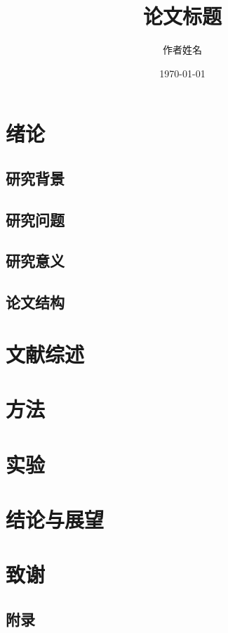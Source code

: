 \documentclass[UTF8,a4paper,12pt]{ctexbook}
\title{论文标题}
\author{作者姓名}
\date{\today}
\begin{document}
\maketitle
\frontmatter
\tableofcontents
\mainmatter

\chapter{绪论}
\section{研究背景}
\section{研究问题}
\section{研究意义}
\section{论文结构}

\chapter{文献综述}
\chapter{方法}
\chapter{实验}
\chapter{结论与展望}

\backmatter



\chapter*{致谢}

\begin{appendix}
\chapter{附录}
\end{appendix}
\end{document}
